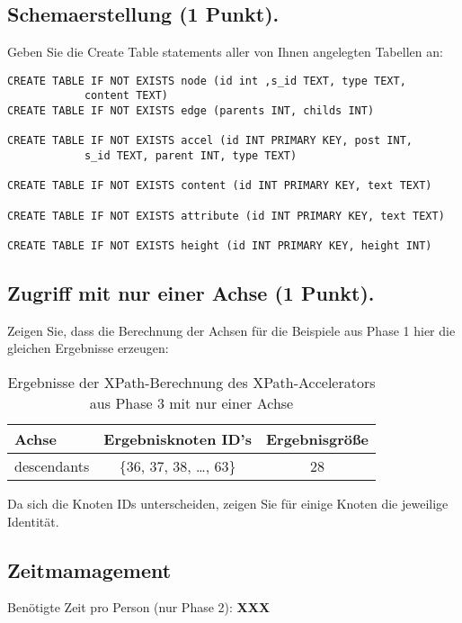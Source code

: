 \documentclass[11pt]{scrartcl}
\begin{document}
\subsection*{Schemaerstellung (1 Punkt).}
Geben Sie die Create Table statements aller von Ihnen angelegten Tabellen an:
\begin{lstlisting}[style=dmrsql]
CREATE TABLE IF NOT EXISTS node (id int ,s_id TEXT, type TEXT,
			content TEXT)
CREATE TABLE IF NOT EXISTS edge (parents INT, childs INT)

CREATE TABLE IF NOT EXISTS accel (id INT PRIMARY KEY, post INT,
			s_id TEXT, parent INT, type TEXT)

CREATE TABLE IF NOT EXISTS content (id INT PRIMARY KEY, text TEXT)

CREATE TABLE IF NOT EXISTS attribute (id INT PRIMARY KEY, text TEXT)

CREATE TABLE IF NOT EXISTS height (id INT PRIMARY KEY, height INT)
\end{lstlisting}

\subsection*{Zugriff mit nur einer Achse (1 Punkt).}
Zeigen Sie, dass die Berechnung der Achsen für die Beispiele aus Phase 1 hier die gleichen Ergebnisse erzeugen:

\begin{table}[h]
	\centering
		\begin{center}
			\begin{tabular}{ l | c c }
				\toprule
				Achse & Ergebnisknoten ID's & Ergebnisgröße\\
				\midrule
				descendants & \{36, 37, 38, \ldots, 63\} & 28 \\
				\bottomrule
			\end{tabular}
			\end{center}
	\caption{Ergebnisse der XPath-Berechnung des XPath-Accelerators aus Phase 3 mit nur einer Achse}
	\label{tab:ErgebnisseDerXPathBerechnug}
\end{table}

Da sich die Knoten IDs unterscheiden, zeigen Sie für einige Knoten die jeweilige Identität.

\subsection*{Zeitmamagement}

Benötigte Zeit pro Person (nur Phase 2): \textbf{XXX}
\end{document}
